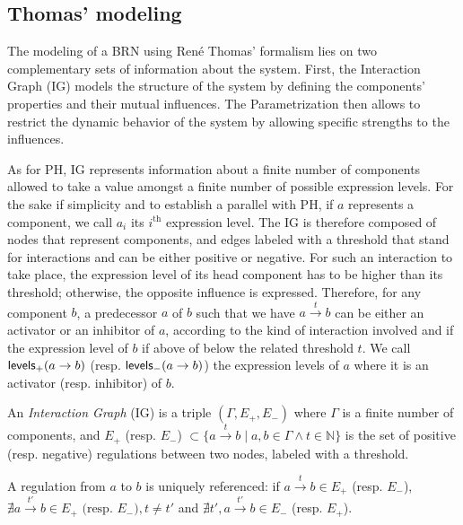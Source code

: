 \subsection{Thomas' modeling}

The modeling of a BRN using René Thomas' formalism lies on two complementary sets of information about the system. First, the Interaction Graph (IG) models the structure of the system by defining the components' properties and their mutual influences. The Parametrization then allows to restrict the dynamic behavior of the system by allowing specific strengths to the influences.

As for PH, IG represents information about a finite number of components allowed to take a value amongst a finite number of possible expression levels.
For the sake if simplicity and to establish a parallel with PH, if $a$ represents a component, we call $a_i$ its $i^\text{th}$ expression level.
The IG is therefore composed of nodes that represent components, and edges labeled with a threshold that stand for interactions and can be either positive or negative.
For such an interaction to take place, the expression level of its head component has to be higher than its threshold; otherwise, the opposite influence is expressed.
Therefore, for any component $b$, a predecessor $a$ of $b$ such that we have $a \xrightarrow{t} b$ can be either an activator or an inhibitor of $a$, according to the kind of interaction involved and if the expression level of $b$ if above of below the related threshold $t$.
We call $\mathsf{levels}_+(a\rightarrow b)$ (resp. $\mathsf{levels}_-(a\rightarrow b)$) the expression levels of $a$ where it is an activator (resp. inhibitor) of $b$.

\begin{definition}
\label{def:ig}
An \emph{Interaction Graph} (IG) is a triple $(\Gamma, E_+, E_-)$ where $\Gamma$ is a finite number of components,
and $E_+$ (resp. $E_-$) $\subset \{a \xrightarrow{t} b \mid a, b \in \Gamma \wedge t \in \mathbb{N}\}$
is the set of positive (resp. negative) regulations between two nodes, labeled with a threshold.

A regulation from $a$ to $b$ is uniquely referenced:
if $a \xrightarrow{t} b \in E_+$ (resp. $E_-$),
$\nexists a \xrightarrow{t'} b \in E_+ \text{ (resp. $E_-$)}, t \neq t'$
and $\nexists t', a \xrightarrow{t'} b \in E_-$ (resp. $E_+$).
\end{definition}

